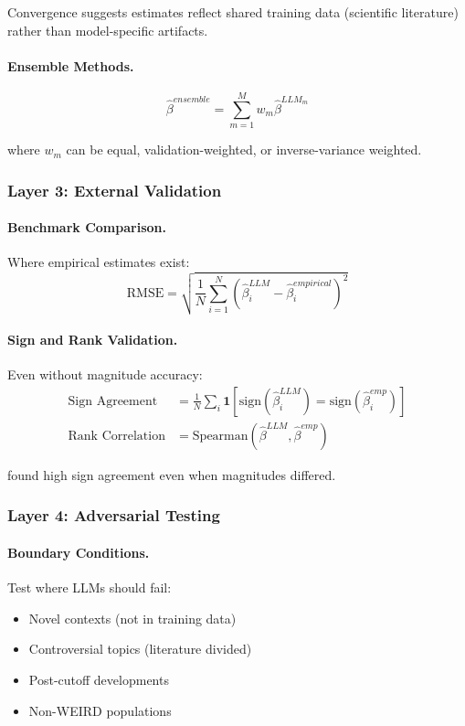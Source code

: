 Convergence suggests estimates reflect shared training data (scientific literature) rather than model-specific artifacts.

\paragraph{Ensemble Methods.}
\begin{equation}
\hat{\beta}^{ensemble} = \sum_{m=1}^{M} w_m \hat{\beta}^{LLM_m}
\end{equation}

where $w_m$ can be equal, validation-weighted, or inverse-variance weighted.

\subsubsection{Layer 3: External Validation}

\paragraph{Benchmark Comparison.}
Where empirical estimates exist:
\begin{equation}
\text{RMSE} = \sqrt{\frac{1}{N}\sum_{i=1}^{N}(\hat{\beta}_i^{LLM} - \hat{\beta}_i^{empirical})^2}
\end{equation}

\paragraph{Sign and Rank Validation.}
Even without magnitude accuracy:
\begin{align}
\text{Sign Agreement} &= \frac{1}{N}\sum_{i}\mathbf{1}[\text{sign}(\hat{\beta}_i^{LLM}) = \text{sign}(\hat{\beta}_i^{emp})] \\
\text{Rank Correlation} &= \text{Spearman}(\hat{\beta}^{LLM}, \hat{\beta}^{emp})
\end{align}

\citet{llmpriors2025scientific} found high sign agreement even when magnitudes differed.

\subsubsection{Layer 4: Adversarial Testing}

\paragraph{Boundary Conditions.}
Test where LLMs should fail:
\begin{itemize}
    \item Novel contexts (not in training data)
    \item Controversial topics (literature divided)
    \item Post-cutoff developments
    \item Non-WEIRD populations
\end{itemize}

